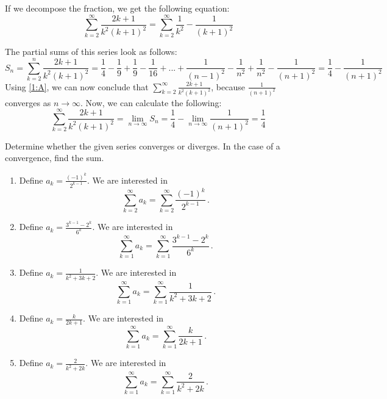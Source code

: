 \documentclass[week=5]{homework}
\begin{document}
\begin{questions}
\begin{parts}
	        If we decompose the fraction, we get the following equation:
	        \[
		        \sum_{k=2}^{\infty} \frac{2k+1}{k^2(k+1)^2} = \sum_{k=2}^{\infty} \frac{1}{k^2} - \frac{1}{(k+1)^2}
	        \] 
	        
	        The partial sums of this series look as follows:
	        \[
		        S_n = \sum_{k = 2}^{n} \frac{2k+1}{k^2(k+1)^2} = \frac{1}{4} - \frac{1}{9} + \frac{1}{9} - \frac{1}{16} + ... + \frac{1}{(n - 1)^2} - \frac{1}{n^2} + \frac{1}{n^2} - \frac{1}{(n + 1)^2} = \frac{1}{4} - \frac{1}{(n + 1)^2}
	        \]
	        Using \ref{1:A}, we can now conclude that $\sum_{k=2}^{\infty} \frac{2k+1}{k^2(k+1)^2}$, because $\frac{1}{(n + 1)^2}$ converges as $n \to \infty$. Now, we can calculate the following: 
	        \[
		        \sum_{k=2}^{\infty} \frac{2k+1}{k^2(k+1)^2} = \lim_{n \to \infty} S_n = \frac{1}{4} - \lim_{n \to \infty} \frac{1}{(n + 1)^2} = \frac{1}{4}
	        \]
	        
        \end{parts}
    
	    \question
	    Determine whether the given series converges or diverges. In the case of a convergence, find the sum.
	    
	    
	    \begin{enumerate}[label=(\alph*)]
	    	\item Define $a_k = \frac{(-1)^k}{2^{k-1}}$. We are interested in 
	    	\[
		    	\sum_{k=2}^{\infty} a_k = \sum_{k=2}^{\infty} \frac{(-1)^k}{2^{k-1}}\,.
	    	\]
	    	
	    	\item Define $a_k = \frac{3^{k-1} - 2^k}{6^k}$. We are interested in 
	    	\[
	    	\sum_{k=1}^{\infty} a_k = \sum_{k=1}^{\infty} \frac{3^{k-1} - 2^k}{6^k}\,.
	    	\]
	    	
	    	\item Define $a_k = \frac{1}{k^2 + 3k + 2}$. We are interested in 
	    	\[
	    	\sum_{k=1}^{\infty} a_k = \sum_{k=1}^{\infty} \frac{1}{k^2 + 3k + 2}\,.
	    	\]
	    	
	    	\addtocounter{enumi}{1}
	    	\item Define $a_k = \frac{k}{2k+1}$. We are interested in 
	    	\[
	    	\sum_{k=1}^{\infty} a_k = \sum_{k=1}^{\infty} \frac{k}{2k+1}\,.
	    	\]
	    	
	    	\item Define $a_k = \frac{2}{k^2+2k}$. We are interested in 
	    	\[
	    	\sum_{k=1}^{\infty} a_k = \sum_{k=1}^{\infty} \frac{2}{k^2+2k}\,.
	    	\] 
	    	

\end{enumerate}
\end{questions}
\end{document}

